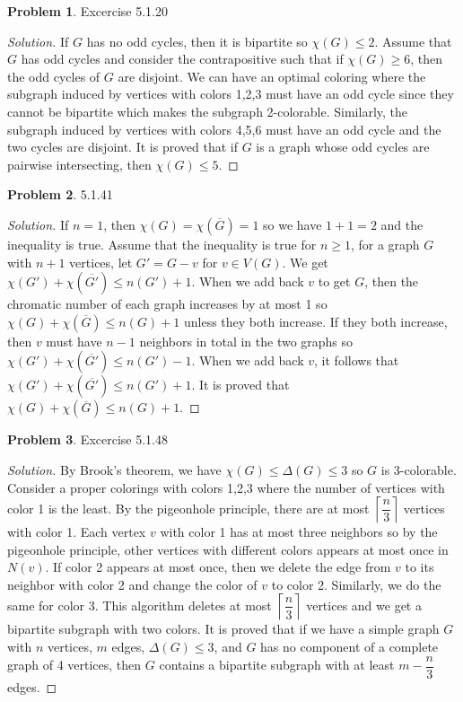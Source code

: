 \documentclass[12pt]{article}
\theoremstyle{definition}
\newtheorem{problem}{Problem}
\newenvironment*{solution}{\begin{proof}[Solution]}{\end{proof}}
\begin{document}
\begin{problem}
    Excercise 5.1.20
\end{problem}
\begin{solution}
    If \(G\) has no odd cycles, then it is bipartite so \(\chi(G)\leq2\).
    Assume that \(G\) has odd cycles and consider the contrapositive such that
    if \(\chi(G)\geq6\), then the odd cycles of \(G\) are disjoint.
    We can have an optimal coloring where the subgraph induced by vertices
    with colors 1,2,3 must have an odd cycle since they cannot be bipartite
    which makes the subgraph 2-colorable.
    Similarly, the subgraph induced by vertices with colors 4,5,6 must have an
    odd cycle and the two cycles are disjoint.
    It is proved that if \(G\) is a graph whose odd cycles are pairwise
    intersecting, then \(\chi(G)\leq5\).
\end{solution}

\begin{problem}
    5.1.41
\end{problem}
\begin{solution}
    If \(n=1\), then \(\chi(G)=\chi(\overline{G})=1\) so we have \(1+1=2\) and
    the inequality is true.
    Assume that the inequality is true for \(n\geq1\),
    for a graph \(G\) with \(n+1\) vertices, let \(G'=G-v\) for \(v\in V(G)\).
    We get \(\chi(G')+\chi(\overline{G'})\leq n(G')+1\).
    When we add back \(v\) to get \(G\), then the chromatic number of each
    graph increases by at most 1 so \(\chi(G)+\chi(\overline{G})\leq n(G)+1\)
    unless they both increase.
    If they both increase, then \(v\) must have \(n-1\) neighbors in total in
    the two graphs so \(\chi(G')+\chi(\overline{G'})\leq n(G')-1\).
    When we add back \(v\), it follows that
    \(\chi(G')+\chi(\overline{G'})\leq n(G')+1\).
    It is proved that \(\chi(G)+\chi(\overline{G})\leq n(G)+1\).
\end{solution}

\begin{problem}
    Excercise 5.1.48
\end{problem}
\begin{solution}
    By Brook's theorem, we have \(\chi(G)\leq\Delta(G)\leq3\) so \(G\) is
    3-colorable.
    Consider a proper colorings with colors 1,2,3 where the number of vertices
    with color 1 is the least.
    By the pigeonhole principle, there are at most
    \(\left\lceil\dfrac{n}{3}\right\rceil\) vertices with color 1.
    Each vertex \(v\) with color 1 has at most three neighbors so by the
    pigeonhole principle, other vertices with different colors appears at most
    once in \(N(v)\).
    If color 2 appears at most once, then we delete the edge from \(v\) to its
    neighbor with color 2 and change the color of \(v\) to color 2.
    Similarly, we do the same for color 3.
    This algorithm deletes at most \(\left\lceil\dfrac{n}{3}\right\rceil\)
    vertices and we get a bipartite subgraph with two colors.
    It is proved that if we have a simple graph \(G\) with \(n\) vertices,
    \(m\) edges, \(\Delta(G)\leq3\), and \(G\) has no component of a complete
    graph of 4 vertices, then \(G\) contains a bipartite subgraph with at
    least \(m-\dfrac{n}{3}\) edges.
\end{solution}
\end{document}
